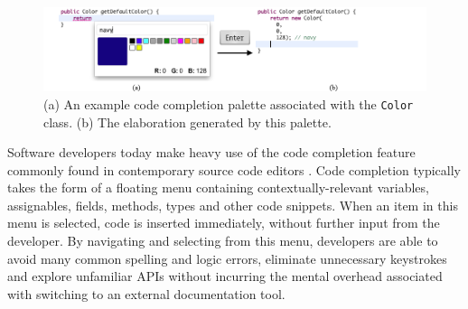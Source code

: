 \begin{figure}[h]\label{color}
\begin{center}
\includegraphics[width=40pc]{color_palette.png}\end{center}
\caption{(a) An example code completion palette associated with the \texttt{Color} class. (b) The elaboration generated by this palette.}
\label{colorpalette}
\end{figure}

\noindent
Software developers today make heavy use of the code completion feature commonly found in contemporary source code editors  \cite{murphy_how_2006}. Code completion typically takes the form of a floating menu containing  contextually-relevant variables, assignables, fields, methods, types and other code snippets. When an item in this menu is selected, code is inserted immediately, without further input from the developer.  By navigating and selecting from this menu, developers are able to avoid many common spelling and logic errors, eliminate unnecessary keystrokes and explore unfamiliar APIs without incurring the mental overhead associated with switching to an external documentation tool.

